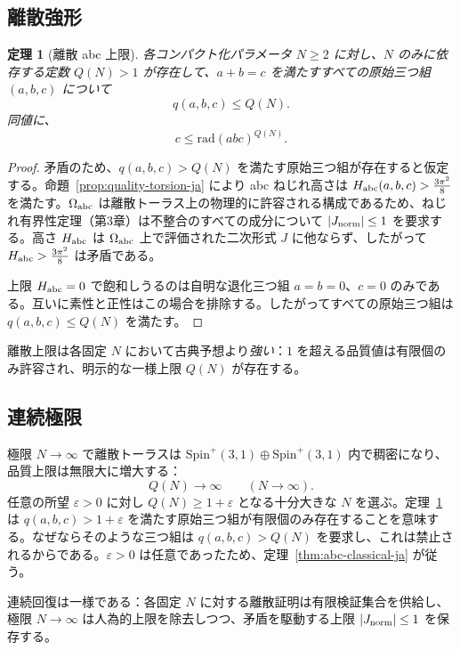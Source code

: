 \documentclass[dvipdfmx,a4paper]{article}
\newtheorem{theorem}{定理}[section]
\theoremstyle{definition}
\theoremstyle{remark}
\newcommand{\Jnorm}{J_{\rm norm}}
\newcommand{\Jbound}{\frac{3\pi^2}{8}}
\begin{document}
\subsection{離散強形}

\begin{theorem}[離散 abc 上限]
\label{thm:discrete-abc-ja}
各コンパクト化パラメータ $N \geq 2$ に対し、$N$ のみに依存する定数 $Q(N) > 1$ が存在して、$a + b = c$ を満たすすべての原始三つ組 $(a,b,c)$ について
\[
q(a,b,c) \leq Q(N).
\]
同値に、
\[
c \leq \mathrm{rad}(abc)^{Q(N)}.
\]
\end{theorem}

\begin{proof}
矛盾のため、$q(a,b,c) > Q(N)$ を満たす原始三つ組が存在すると仮定する。命題~\ref{prop:quality-torsion-ja} により abc ねじれ高さは $H_{\rm abc}(a,b,c) > \Jbound$ を満たす。$\Omega_{\rm abc}$ は離散トーラス上の物理的に許容される構成であるため、ねじれ有界性定理（第3章）は不整合のすべての成分について $|\Jnorm| \leq 1$ を要求する。高さ $H_{\rm abc}$ は $\Omega_{\rm abc}$ 上で評価された二次形式 $J$ に他ならず、したがって $H_{\rm abc} > \Jbound$ は矛盾である。

上限 $H_{\rm abc} = 0$ で飽和しうるのは自明な退化三つ組 $a = b = 0$、$c = 0$ のみである。互いに素性と正性はこの場合を排除する。したがってすべての原始三つ組は $q(a,b,c) \leq Q(N)$ を満たす。
\end{proof}

離散上限は各固定 $N$ において古典予想より\emph{強い}：$1$ を超える品質値は有限個のみ許容され、明示的な一様上限 $Q(N)$ が存在する。

\subsection{連続極限}

極限 $N \to \infty$ で離散トーラスは $\mathrm{Spin}^+(3,1) \oplus \mathrm{Spin}^+(3,1)$ 内で稠密になり、品質上限は無限大に増大する：
\[
Q(N) \to \infty \qquad (N \to \infty).
\]
任意の所望 $\varepsilon > 0$ に対し $Q(N) \geq 1 + \varepsilon$ となる十分大きな $N$ を選ぶ。定理~\ref{thm:discrete-abc-ja} は $q(a,b,c) > 1 + \varepsilon$ を満たす原始三つ組が有限個のみ存在することを意味する。なぜならそのような三つ組は $q(a,b,c) > Q(N)$ を要求し、これは禁止されるからである。$\varepsilon > 0$ は任意であったため、定理~\ref{thm:abc-classical-ja} が従う。

連続回復は一様である：各固定 $N$ に対する離散証明は有限検証集合を供給し、極限 $N \to \infty$ は人為的上限を除去しつつ、矛盾を駆動する上限 $|\Jnorm| \leq 1$ を保存する。
\end{document}
